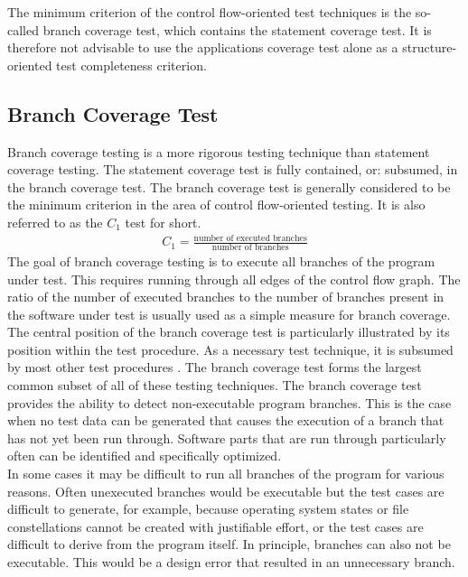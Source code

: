 	The minimum criterion of the control flow-oriented test techniques is the so-called branch coverage test, which contains the statement coverage test. It is therefore not advisable to use the applications coverage test alone as a structure-oriented test completeness criterion.

	\subsection{Branch Coverage Test}
	Branch coverage testing is a more rigorous testing technique than statement coverage testing. The statement coverage test is fully contained, or: subsumed, in the branch coverage test. The branch coverage test is generally considered to be the minimum criterion in the area of control flow-oriented testing. It is also referred to as the $C_1$ test for short.
		\begin{align*}
		C_1 = \frac{\textrm{number of executed branches}}{\textrm{number of branches}}
		\end{align*}
	The goal of branch coverage testing is to execute all branches of the program under test. This requires running through all edges of the control flow graph. The ratio of the number of executed branches to the number of branches present in the software under test is usually used as a simple measure for branch coverage. The central position of the branch coverage test is particularly illustrated by its position within the test procedure. As a necessary test technique, it is subsumed by most other test procedures . The branch coverage test forms the largest common subset of all of these testing techniques. The branch coverage test provides the ability to detect non-executable program branches. This is the case when no test data can be generated that causes the execution of a branch that has not yet been run through. Software parts that are run through particularly often can be identified and specifically optimized. \\
	In some cases it may be difficult to run all branches of the program for various reasons. Often unexecuted branches would be executable but the test cases are difficult to generate, for example, because operating system states or file constellations cannot be created with justifiable effort, or the test cases are difficult to derive from the program itself. In principle, branches can also not be executable. This would be a design error that resulted in an unnecessary branch. \\

